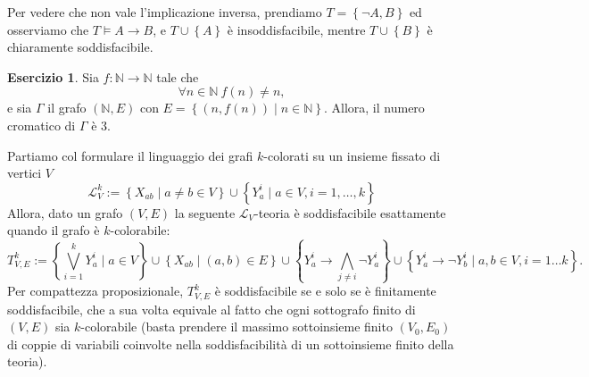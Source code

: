 \documentclass[a4paper]{article}
\newcommand{\N}{\mathbb{N}}
\newcommand{\limplies}{\rightarrow}
\theoremstyle{definition}
\theoremstyle{definition}
\theoremstyle{remark}
\theoremstyle{definition}
\newtheorem{exercise}{Esercizio}[section]
\begin{document}
Per vedere che non vale l'implicazione inversa, prendiamo $T=\left\{ \lnot A, B \right\} $ ed osserviamo che $T\models A\limplies B$, e $T\cup\left\{ A \right\} $ è insoddisfacibile,
mentre $T\cup\left\{ B \right\} $ è chiaramente soddisfacibile.
\setcounter{exercise}{31}
\begin{exercise}
	Sia $f: \N\to\N$ tale che $$\forall n\in\N~f(n)\neq n,$$
	e sia $\Gamma$ il grafo $(\N,E)$ con $E=\left\{ (n,f(n))\mid n\in\N \right\} $.
	Allora, il numero cromatico di $\Gamma$ è 3.
\end{exercise}
\noindent
Partiamo col formulare il linguaggio dei grafi $k$-colorati su un insieme fissato di vertici $V$ $$\mathcal{L}_V^k:=\left\{ X_{ab}\mid a\neq b\in V \right\}\cup\left\{ Y_a^i\mid a\in V,
i=1,\dots,k \right\}$$
Allora, dato un grafo $(V,E)$ la seguente $\mathcal{L}_V$-teoria è soddisfacibile esattamente quando il grafo è $k$-colorabile:
$$ T^k_{V,E}:=\left\{ \bigvee_{i=1}^k Y^i_a\mid a\in V\right\} \cup\left\{ X_{ab}\mid (a,b)\in E \right\} \cup \left\{ Y_a^i\limplies\bigwedge_{j\neq i}{\lnot Y^i_a} \right\} \cup
\left\{ Y_a^i\limplies\lnot Y_b^i\mid a,b\in V,i=1\dots k \right\}  .$$
Per compattezza proposizionale, $T_{V,E}^k$ è soddisfacibile se e solo se è finitamente soddisfacibile, che a sua volta equivale al fatto che ogni sottografo finito di $(V,E)$ sia
$k$-colorabile (basta prendere il massimo sottoinsieme finito $(V_0,E_0)$ di coppie di variabili coinvolte nella soddisfacibilità di un sottoinsieme finito della teoria).
\end{document}
